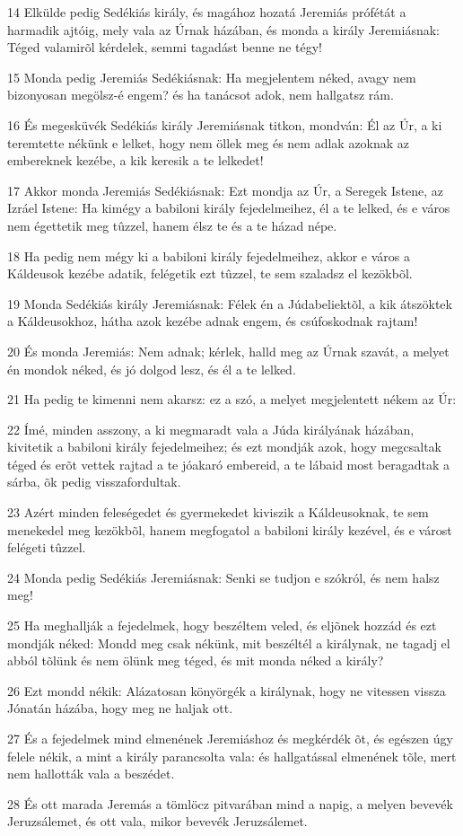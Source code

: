 \par 14 Elkülde pedig Sedékiás király, és magához hozatá Jeremiás prófétát a harmadik ajtóig, mely vala az Úrnak házában, és monda a király Jeremiásnak: Téged valamirõl kérdelek, semmi tagadást benne ne tégy!
\par 15 Monda pedig Jeremiás Sedékiásnak: Ha megjelentem néked, avagy nem bizonyosan megölsz-é engem? és ha tanácsot adok, nem hallgatsz rám.
\par 16 És megesküvék Sedékiás király Jeremiásnak titkon, mondván: Él az Úr, a ki teremtette nékünk e lelket, hogy nem öllek meg és nem adlak azoknak az embereknek kezébe, a kik keresik a te lelkedet!
\par 17 Akkor monda Jeremiás Sedékiásnak: Ezt mondja az Úr, a Seregek Istene, az Izráel Istene: Ha kimégy a babiloni király fejedelmeihez, él a te lelked, és e város nem égettetik meg tûzzel, hanem élsz te és a te házad népe.
\par 18 Ha pedig nem mégy ki a babiloni király fejedelmeihez, akkor e város a Káldeusok kezébe adatik, felégetik ezt tûzzel, te sem szaladsz el kezökbõl.
\par 19 Monda Sedékiás király Jeremiásnak: Félek én a Júdabeliektõl, a kik átszöktek a Káldeusokhoz, hátha azok kezébe adnak engem, és csúfoskodnak rajtam!
\par 20 És monda Jeremiás: Nem adnak; kérlek, halld meg az Úrnak szavát, a melyet én mondok néked, és jó dolgod lesz, és él a te lelked.
\par 21 Ha pedig te kimenni nem akarsz: ez a szó, a melyet megjelentett nékem az Úr:
\par 22 Ímé, minden asszony, a ki megmaradt vala a Júda királyának házában, kivitetik a babiloni király fejedelmeihez; és ezt mondják azok, hogy megcsaltak téged és erõt vettek rajtad a te jóakaró embereid, a te lábaid most beragadtak a sárba, õk pedig visszafordultak.
\par 23 Azért minden feleségedet és gyermekedet kiviszik a Káldeusoknak, te sem menekedel meg kezökbõl, hanem megfogatol a babiloni király kezével, és e várost felégeti tûzzel.
\par 24 Monda pedig Sedékiás Jeremiásnak: Senki se tudjon e szókról, és nem halsz meg!
\par 25 Ha meghallják a fejedelmek, hogy beszéltem veled, és eljõnek hozzád és ezt mondják néked: Mondd meg csak nékünk, mit beszéltél a királynak, ne tagadj el abból tõlünk és nem ölünk meg téged, és mit monda néked a király?
\par 26 Ezt mondd nékik: Alázatosan könyörgék a királynak, hogy ne vitessen vissza Jónatán házába, hogy meg ne haljak ott.
\par 27 És a fejedelmek mind elmenének Jeremiáshoz és megkérdék õt, és egészen úgy felele nékik, a mint a király parancsolta vala: és hallgatással elmenének tõle, mert nem hallották vala a beszédet.
\par 28 És ott marada Jeremás a tömlöcz pitvarában mind a napig, a melyen bevevék Jeruzsálemet, és ott vala, mikor bevevék Jeruzsálemet.

